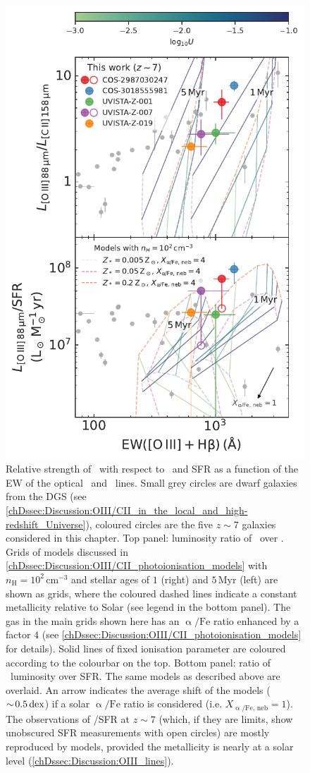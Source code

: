 \begin{figure}
    \centering
    \includegraphics[width=0.6\linewidth]{"Plots/ChapterD/EW_OIII_Hb_OIII_CII_models"}
    \caption[Ratios of \OIIILam\ over \CIILam\ and \OIIILam\ over SFR as a function of $\text{EW} ( \OIIIf + \Hbeta )$.]{Relative strength of \OIIILam\ with respect to \CIILam\ and SFR as a function of the EW of the optical \OIIIf\ and \Hbeta\ lines. Small grey circles are dwarf galaxies from the DGS (see \cref{chDssec:Discussion:OIII/CII_in_the_local_and_high-redshift_Universe}), coloured circles are the five $z \sim 7$ galaxies considered in this chapter. Top panel: luminosity ratio of \OIIIf\ over \CII. Grids of  models discussed in \cref{chDssec:Discussion:OIII/CII_photoionisation_models} with $n_\text{H} = 10^2 \, \mathrm{cm^{-3}}$ and stellar ages of $1$ (right) and $5 \, \mathrm{Myr}$ (left) are shown as grids, where the coloured dashed lines indicate a constant metallicity relative to Solar (see legend in the bottom panel). The gas in the main grids shown here has an $\mathrm{\upalpha/Fe}$ ratio enhanced by a factor $4$ (see \cref{chDssec:Discussion:OIII/CII_photoionisation_models} for details). Solid lines of fixed ionisation parameter are coloured according to the colourbar on the top. Bottom panel: ratio of \OIIIf\ luminosity over SFR. The same  models as described above are overlaid. An arrow indicates the average shift of the models ($\sim \! 0.5 \, \mathrm{dex}$) if a solar $\mathrm{\upalpha/Fe}$ ratio is considered (i.e. $X_\mathrm{\upalpha/Fe, \, neb} = 1$). The observations of \OIIIf/SFR at $z \sim 7$ (which, if they are limits, show unobscured SFR measurements with open circles) are mostly reproduced by  models, provided the metallicity is nearly at a solar level (\cref{chDssec:Discussion:OIII_lines}).
    }
    \label{chDfig:OIII_and_CII_vs_EW(OIII+Hbeta)}
\end{figure}

